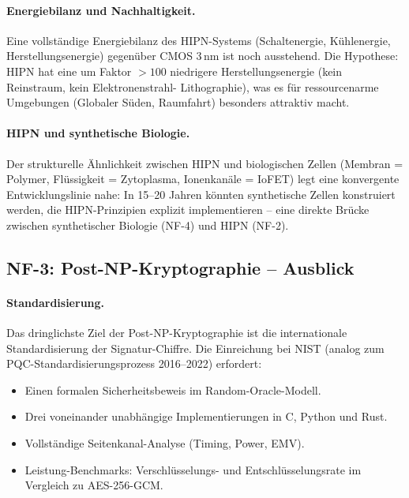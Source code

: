 ﻿\documentclass[a4paper,12pt]{scrreprt}
\theoremstyle{definition}
\begin{document}
\paragraph{Energiebilanz und Nachhaltigkeit.}
Eine vollständige Energiebilanz des HIPN-Systems (Schaltenergie,
Kühlenergie, Herstellungsenergie) gegenüber CMOS 3\,nm ist noch
ausstehend. Die Hypothese: HIPN hat eine um Faktor $> 100$ niedrigere
Herstellungsenergie (kein Reinstraum, kein Elektronenstrahl-
Lithographie), was es für ressourcenarme Umgebungen (Globaler Süden,
Raumfahrt) besonders attraktiv macht.

\paragraph{HIPN und synthetische Biologie.}
Der strukturelle Ähnlichkeit zwischen HIPN und biologischen Zellen
(Membran = Polymer, Flüssigkeit = Zytoplasma, Ionenkanäle = IoFET)
legt eine konvergente Entwicklungslinie nahe: In 15--20 Jahren
könnten synthetische Zellen konstruiert werden, die HIPN-Prinzipien
explizit implementieren -- eine direkte Brücke zwischen synthetischer
Biologie (NF-4) und HIPN (NF-2).

\subsection*{NF-3: Post-NP-Kryptographie -- Ausblick}

\paragraph{Standardisierung.}
Das dringlichste Ziel der Post-NP-Kryptographie ist die internationale
Standardisierung der Signatur-Chiffre. Die Einreichung bei NIST
(analog zum PQC-Standardisierungsprozess 2016--2022) erfordert:
\begin{itemize}
  \item Einen formalen Sicherheitsbeweis im Random-Oracle-Modell.
  \item Drei voneinander unabhängige Implementierungen in C, Python und Rust.
  \item Vollständige Seitenkanal-Analyse (Timing, Power, EMV).
  \item Leistung-Benchmarks: Verschlüsselungs- und Entschlüsselungsrate
    im Vergleich zu AES-256-GCM.
\end{itemize}
\end{document}
